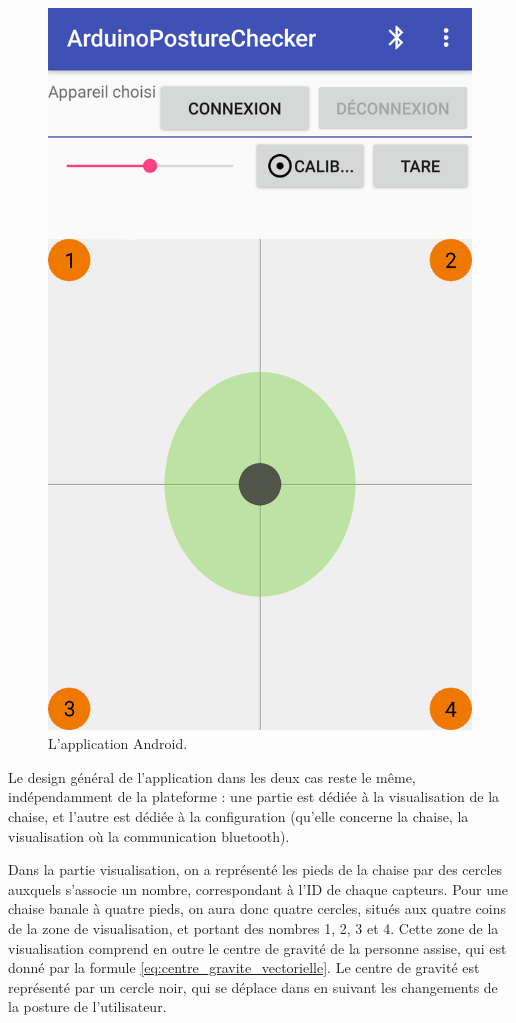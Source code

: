 \documentclass{polytech/polytech}
\begin{document}
\begin{figure}[htbp]
\begin{center}
\includegraphics[width=12cm]{image/screenshot_android1}
\end{center}
\caption{L'application Android.}
\label{fig:screenshot_android}
\end{figure}

Le design général de l'application dans les deux cas reste le même, indépendamment de la plateforme :  une partie est dédiée à la visualisation de la chaise, et l'autre est dédiée à la configuration (qu'elle concerne la chaise, la visualisation où la communication bluetooth). 

Dans la partie visualisation, on a représenté les pieds de la chaise par des cercles auxquels s'associe un nombre, correspondant à l'ID de chaque capteurs. Pour une chaise banale à quatre pieds, on aura donc quatre cercles, situés aux quatre coins de la zone de visualisation, et portant des nombres 1, 2, 3 et 4.
Cette zone de la visualisation comprend en outre le centre de gravité de la personne assise, qui est donné par la formule \eqref{eq:centre_gravite_vectorielle}. Le centre de gravité est représenté par un cercle noir, qui se déplace dans en suivant les changements de la posture de l'utilisateur.
\end{document}
